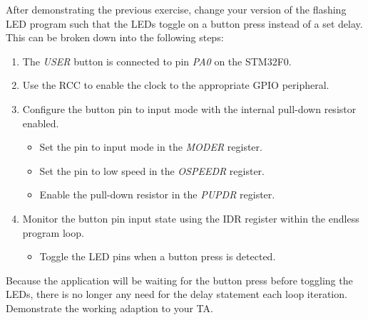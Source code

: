 \documentclass[11pt,fleqn]{book} %
\begin{document}
%


\begin{exercise}
After demonstrating the previous exercise, change your version of the flashing LED program such that the LEDs toggle on a button press instead of a set delay. This can be broken down into the following steps:

\begin{enumerate}
    \item The \textit{USER} button is connected to pin \textit{PA0} on the STM32F0.
    \item Use the RCC to enable the clock to the appropriate GPIO peripheral.
    \item Configure the button pin to input mode with the internal pull-down resistor enabled.
    \begin{itemize}
        \item Set the pin to input mode in the \textit{MODER} register. 
        \item Set the pin to low speed in the \textit{OSPEEDR} register. 
        \item Enable the pull-down resistor in the \textit{PUPDR} register. 
    \end{itemize}
    \item Monitor the button pin input state using the IDR register within the endless program loop.
    \begin{itemize}
        \item Toggle the LED pins when a button press is detected.
    \end{itemize}
\end{enumerate}

\noindent Because the application will be waiting for the button press before toggling the LEDs, there is no longer any need for the delay statement each loop iteration. Demonstrate the working adaption to your TA. 
\end{exercise}
\end{document}
